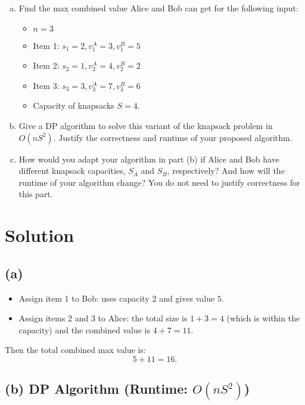 \documentclass[11pt]{article}
\begin{document}
\begin{tcolorbox}[title={Problem 1 (Knapsack, Take II, 50 pts)}]
        \begin{enumerate}[(a)]
            \item Find the max combined value Alice and Bob can get for the following input:
            \begin{itemize}
                \item \( n = 3 \)
                \item Item 1: \( s_1 = 2, v_1^A = 3, v_1^B = 5 \)
                \item Item 2: \( s_2 = 1, v_2^A = 4, v_2^B = 2 \)
                \item Item 3: \( s_3 = 3, v_3^A = 7, v_3^B = 6 \)
                \item Capacity of knapsacks \(S = 4\).
            \end{itemize} 
            \item Give a DP algorithm to solve this variant of the knapsack problem in $O(nS^2)$. Justify the correctness and runtime of your proposed algorithm. 
            \item How would you adapt your algorithm in part (b) if Alice and Bob have different knapsack capacities, \(S_A\) and \(S_B\), respectively? And how will the runtime of your algorithm change? You do not need to justify correctness for this part.
        \end{enumerate}
    \end{tcolorbox}

    \section*{Solution}

    \subsection*{(a)}
    \begin{itemize}
        \item Assign item 1 to Bob: uses capacity \(2\) and gives value \(5\).
        \item Assign items 2 and 3 to Alice: the total size is \(1+3=4\) (which is within the capacity) and the combined value is \(4+7=11\).
    \end{itemize}
    Then the total combined max value is:
    \[
    5 + 11 = 16.
    \]
    
    \subsection*{(b) DP Algorithm (Runtime: \(O(nS^2)\))}
    
\end{document}
